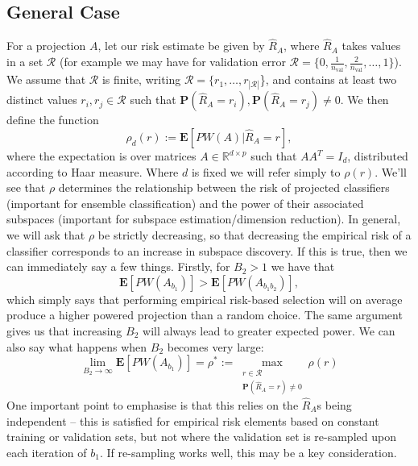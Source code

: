 \documentclass[12pt]{article}
\begin{document}
\subsection{General Case}
For a projection $A$, let our risk estimate be given by $\hat{R}_A$, where $\hat{R}_A$ takes values in a set $\mathcal{R}$ (for example we may have for validation error $\mathcal{R} = \{0, \frac{1}{n_{\text{val}}}, \frac{2}{n_{\text{val}}}, \ldots, 1 \} $). We assume that $\mathcal{R}$ is finite, writing $\mathcal{R} = \{r_1, \dots, r_{|\mathcal{R}|}$\}, and contains at least two distinct values $r_i, r_j \in \mathcal{R}$ such that $\mathbf{P}(\hat{R}_A = r_i), \mathbf{P}(\hat{R}_A = r_j) \neq 0$. We then define the function 
\[ \rho_d(r) := \mathbf{E}[PW(A) | \hat{R}_A = r], \]
where the expectation is over matrices $A \in \mathbb{R}^{d\times p}$ such that $AA^T = I_d$, distributed according to Haar measure. Where $d$ is fixed we will refer simply to $\rho(r)$.
We'll see that $\rho$ determines the relationship between the risk of projected classifiers (important for ensemble classification) and the power of their associated subspaces (important for subspace estimation/dimension reduction). In general, we will ask that $\rho$ be strictly decreasing, so that decreasing the empirical risk of a classifier corresponds to an increase in subspace discovery. If this is true, then we can immediately say a few things. Firstly, for $B_2 > 1$ we have that
\begin{equation} \label{eq:increasedpower}
\mathbf{E}[PW(A_{b_1})] > \mathbf{E}[PW(A_{b_1b_2})],
\end{equation}
which simply says that performing empirical risk-based selection will on average produce a higher powered projection than a random choice. The same argument gives us that increasing $B_2$ will always lead to greater expected power. We can also say what happens when $B_2$ becomes very large:
\begin{equation} \label{eq:infiniteb2}
   \lim_{B_2 \rightarrow \infty} \mathbf{E}[PW(A_{b_1})] = \rho^* := \max_{\substack{r \in \mathcal{R}  \\ \mathbf{P}(\hat{R}_A = r)\neq 0}} \rho(r) 
\end{equation}
One important point to emphasise is that this relies on the $\hat{R}_A$s being independent -- this is satisfied for empirical risk elements based on constant training or validation sets, but not where the validation set is re-sampled upon each iteration of $b_1$. If re-sampling works well, this may be a key consideration.
\end{document}
